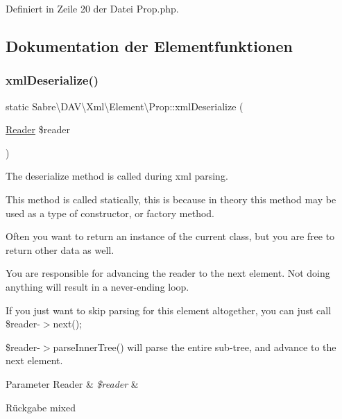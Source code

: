 Definiert in Zeile 20 der Datei Prop.\+php.



\subsection{Dokumentation der Elementfunktionen}
\mbox{\label{class_sabre_1_1_d_a_v_1_1_xml_1_1_element_1_1_prop_acd9e1f30391301515157fe322d4a6eb2}} 
\subsubsection{\texorpdfstring{xml\+Deserialize()}{xmlDeserialize()}}
{\footnotesize\ttfamily static Sabre\textbackslash{}\+D\+A\+V\textbackslash{}\+Xml\textbackslash{}\+Element\textbackslash{}\+Prop\+::xml\+Deserialize (\begin{DoxyParamCaption}\item[{\mbox{\hyperlink{class_sabre_1_1_xml_1_1_reader}{Reader}}}]{\$reader }\end{DoxyParamCaption})\hspace{0.3cm}{\ttfamily [static]}}

The deserialize method is called during xml parsing.

This method is called statically, this is because in theory this method may be used as a type of constructor, or factory method.

Often you want to return an instance of the current class, but you are free to return other data as well.

You are responsible for advancing the reader to the next element. Not doing anything will result in a never-\/ending loop.

If you just want to skip parsing for this element altogether, you can just call \$reader-\/$>$next();

\$reader-\/$>$parse\+Inner\+Tree() will parse the entire sub-\/tree, and advance to the next element.


\begin{DoxyParams}[1]{Parameter}
Reader & {\em \$reader} & \\
\hline
\end{DoxyParams}
\begin{DoxyReturn}{Rückgabe}
mixed 
\end{DoxyReturn}


